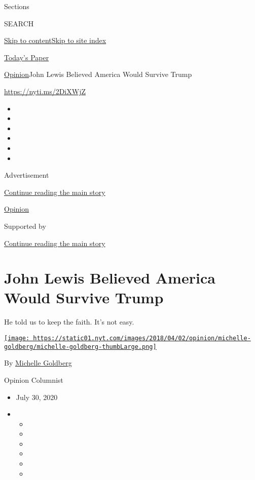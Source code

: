 Sections

SEARCH

\protect\hyperlink{site-content}{Skip to
content}\protect\hyperlink{site-index}{Skip to site index}

\href{https://myaccount.nytimes.com/auth/login?response_type=cookie\&client_id=vi}{}

\href{https://www.nytimes.com/section/todayspaper}{Today's Paper}

\href{/section/opinion}{Opinion}\textbar{}John Lewis Believed America
Would Survive Trump

\url{https://nyti.ms/2DiXWjZ}

\begin{itemize}
\item
\item
\item
\item
\item
\item
\end{itemize}

Advertisement

\protect\hyperlink{after-top}{Continue reading the main story}

\href{/section/opinion}{Opinion}

Supported by

\protect\hyperlink{after-sponsor}{Continue reading the main story}

\hypertarget{john-lewis-believed-america-would-survive-trump}{%
\section{John Lewis Believed America Would Survive
Trump}\label{john-lewis-believed-america-would-survive-trump}}

He told us to keep the faith. It's not easy.

\href{https://www.nytimes.com/by/michelle-goldberg}{\texttt{[image: https://static01.nyt.com/images/2018/04/02/opinion/michelle-goldberg/michelle-goldberg-thumbLarge.png]}}

By \href{https://www.nytimes.com/by/michelle-goldberg}{Michelle
Goldberg}

Opinion Columnist

\begin{itemize}
\item
  July 30, 2020
\item
  \begin{itemize}
  \item
  \item
  \item
  \item
  \item
  \item
  \end{itemize}
\end{itemize}

